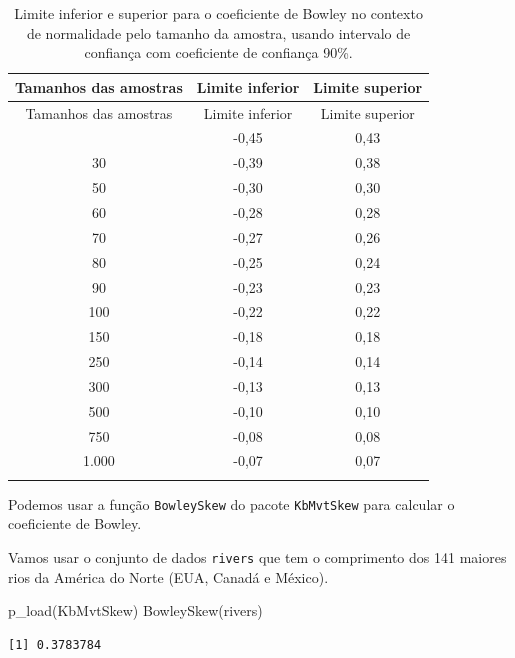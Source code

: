 \documentclass[
  10pt,
  ignorenonframetext,
]{beamer}
\newenvironment{Shaded}{\begin{snugshade}}{\end{snugshade}}
\newcommand{\FunctionTok}[1]{\textcolor[rgb]{0.28,0.35,0.67}{#1}}
\newcommand{\NormalTok}[1]{\textcolor[rgb]{0.00,0.23,0.31}{#1}}
\begin{document}
\begin{frame}
\begin{longtable}[]{@{}ccc@{}}
\caption{Limite inferior e superior para o coeficiente de Bowley no
contexto de normalidade pelo tamanho da amostra, usando intervalo de
confiança com coeficiente de confiança 90\%.}\tabularnewline
\toprule\noalign{}
Tamanhos das amostras & Limite inferior & Limite superior \\
\midrule\noalign{}
\endfirsthead
\toprule\noalign{}
Tamanhos das amostras & Limite inferior & Limite superior \\
\midrule\noalign{}
\endhead
25 & -0,45 & 0,43 \\
30 & -0,39 & 0,38 \\
50 & -0,30 & 0,30 \\
60 & -0,28 & 0,28 \\
70 & -0,27 & 0,26 \\
80 & -0,25 & 0,24 \\
90 & -0,23 & 0,23 \\
100 & -0,22 & 0,22 \\
150 & -0,18 & 0,18 \\
250 & -0,14 & 0,14 \\
300 & -0,13 & 0,13 \\
500 & -0,10 & 0,10 \\
750 & -0,08 & 0,08 \\
1.000 & -0,07 & 0,07 \\
\bottomrule\noalign{}
\end{longtable}
\end{frame}

\begin{frame}[fragile]
Podemos usar a função \texttt{BowleySkew} do pacote \texttt{KbMvtSkew}
para calcular o coeficiente de Bowley.

Vamos usar o conjunto de dados \texttt{rivers} que tem o comprimento dos
141 maiores rios da América do Norte (EUA, Canadá e México).

\begin{Shaded}
\begin{Highlighting}[]
\FunctionTok{p\_load}\NormalTok{(KbMvtSkew)}
\FunctionTok{BowleySkew}\NormalTok{(rivers)}
\end{Highlighting}
\end{Shaded}

\begin{verbatim}
[1] 0.3783784
\end{verbatim}
\end{frame}
\end{document}
